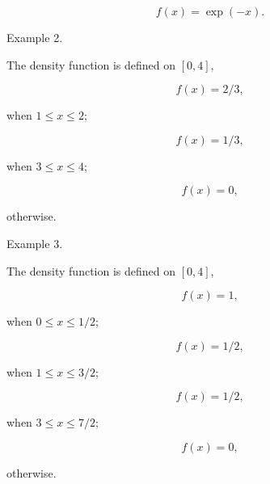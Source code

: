 \documentclass [18pt]{article}
\begin{document}
\[
f(x) = \exp ( - x).
\]



Example 2.

The density function is defined on $[0,4]$,


\[
f(x) = 2 / 3,
\]



\noindent
when $1 \le x \le 2$;


\[
f(x) = 1 / 3,
\]



\noindent
when $3 \le x \le 4$;


\[
f(x) = 0,
\]



\noindent
otherwise.

Example 3.

The density function is defined on $[0,4]$,


\[
f(x) = 1,
\]



\noindent
when $0 \le x \le 1 / 2$;


\[
f(x) = 1 / 2,
\]



\noindent
when $1 \le x \le 3 / 2$;


\[
f(x) = 1 / 2,
\]



\noindent
when $3 \le x \le 7 / 2$;


\[
f(x) = 0,
\]



\noindent
otherwise.
\end{document}

